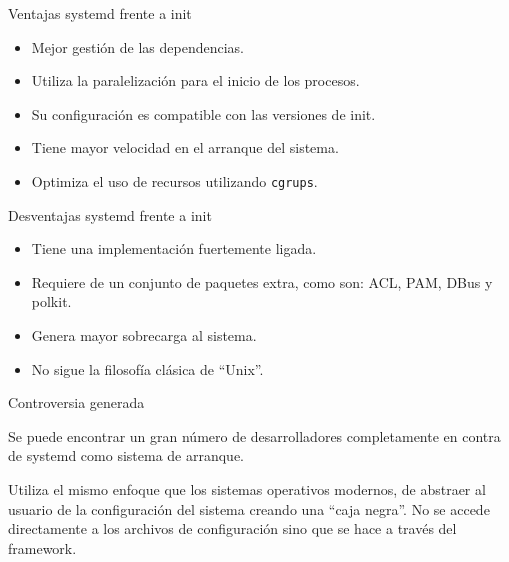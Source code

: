 \documentclass[11pt]{beamer}
\begin{document}
\begin{frame}{Ventajas systemd frente a init} %

\begin{itemize}
\item Mejor gestión de las dependencias.
\item Utiliza la paralelización para el inicio de los procesos.
\item Su configuración es compatible con las versiones de init.
\item Tiene mayor velocidad en el arranque del sistema.
\item Optimiza el uso de recursos utilizando \texttt{cgrups}.
\end{itemize}

\end{frame}


\begin{frame}{Desventajas systemd frente a init} %

\begin{itemize}
\item Tiene una implementación fuertemente ligada.
\item Requiere de un conjunto de paquetes extra, como son: ACL, PAM, DBus y polkit.
\item Genera mayor sobrecarga al sistema.
\item No sigue la filosofía clásica de ``Unix''.
\end{itemize}

\end{frame}

\begin{frame}{Controversia generada} %

Se puede encontrar un gran número de desarrolladores completamente en contra de systemd como sistema de arranque.

\vspace{0.5cm}

Utiliza el mismo enfoque que los sistemas operativos modernos, de abstraer al usuario de la configuración del sistema creando una ``caja negra''. No se accede directamente a los archivos de configuración sino que se hace a través del framework.

\end{frame}
\end{document}
